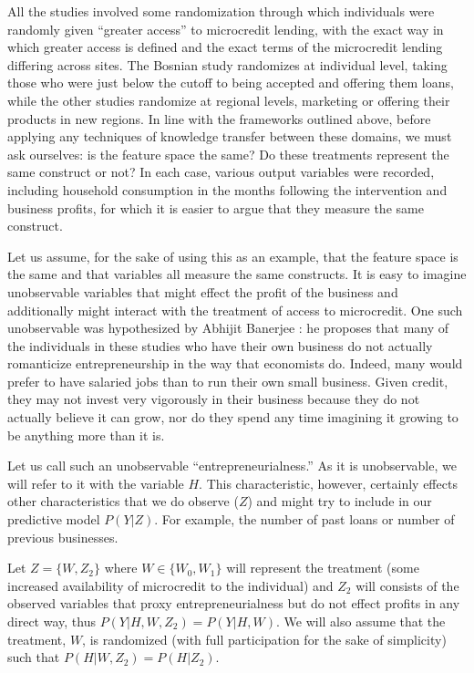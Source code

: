 \documentclass[a4paper,12pt]{article}
\begin{document}
All the studies involved some randomization through which individuals were randomly given ``greater access'' to microcredit lending, with the exact way in which greater access is defined and the exact terms of the microcredit lending differing across sites. The Bosnian study randomizes at individual level, taking those who were just below the cutoff to being accepted and offering them loans, while the other studies randomize at regional levels, marketing or offering their products in new regions. In line with the frameworks outlined above, before applying any techniques of knowledge transfer between these domains, we must ask ourselves: is the feature space the same? Do these treatments represent the same construct or not? In each case, various output variables were recorded, including household consumption in the months following the intervention and business profits, for which it is easier to argue that they measure the same construct.

Let us assume, for the sake of using this as an example, that the feature space is the same and that variables all measure the same constructs. It is easy to imagine unobservable variables that might effect the profit of the business and additionally might interact with the treatment of access to microcredit. One such unobservable was hypothesized by Abhijit Banerjee \parencite*{Banerjee2011}: he proposes that many of the individuals in these studies who have their own business do not actually romanticize entrepreneurship in the way that economists do. Indeed, many would prefer to have salaried jobs than to run their own small business. Given credit, they may not invest very vigorously in their business because they do not actually believe it can grow, nor do they spend any time imagining it growing to be anything more than it is. 

Let us call such an unobservable ``entrepreneurialness.'' As it is unobservable, we will refer to it with the variable $H$. This characteristic, however, certainly effects other characteristics that we do observe ($Z$) and might try to include in our predictive model $P(Y|Z)$. For example, the number of past loans or number of previous businesses. 

Let $Z = \{ W, Z_2 \}$ where $W \in \{ W_0, W_1\}$ will represent the treatment (some increased availability of microcredit to the individual) and $Z_2$ will consists of the observed variables that proxy entrepreneurialness but do not effect profits in any direct way, thus $P(Y|H,W,Z_2) = P(Y|H,W)$. We will also assume that the treatment, $W$, is randomized (with full participation for the sake of simplicity) such that $P(H|W,Z_2) = P(H|Z_2)$.
\end{document}
